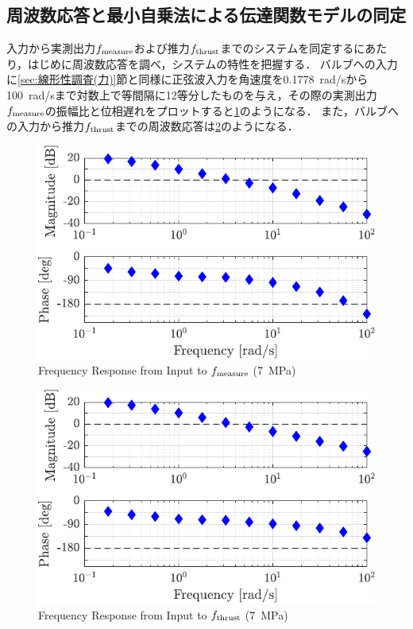 \subsection{周波数応答と最小自乗法による伝達関数モデルの同定}
入力から実測出力$f_\mathrm{measure}$および推力$f_\mathrm{thrust}$までのシステムを同定するにあたり，はじめに周波数応答を調べ，システムの特性を把握する．
バルブへの入力に\ref{sec:線形性調査(力)}節と同様に正弦波入力を角速度を\SI{0.1778}{rad/s}から\SI{100}{rad/s}まで対数上で等間隔に12等分したものを与え，その際の実測出力$f_\mathrm{measure}$の振幅比と位相遅れをプロットすると\figname\ref{fig:crop-1018_manubode_in2fmea_7MPa}のようになる．
また，バルブへの入力から推力$f_\mathrm{thrust}$までの周波数応答は\figname\ref{fig:crop-1018_manubode_in2fthr_7MPa}のようになる．
\begin{figure}[t]
    \centering
        \includegraphics[keepaspectratio, scale=1.0]{contents/システム同定/figure/crop-1018_manubode_in2fmea_7MPa.pdf}
        \caption{Frequency Response from Input to $f_\mathrm{measure}$ (\SI{7}{MPa})}
        \label{fig:crop-1018_manubode_in2fmea_7MPa}
\end{figure}
\begin{figure}[t]
    \centering
        \includegraphics[keepaspectratio, scale=1.0]{contents/システム同定/figure/crop-1018_manubode_in2fthr_7MPa.pdf}
        \caption{Frequency Response from Input to $f_\mathrm{thrust}$ (\SI{7}{MPa})}
        \label{fig:crop-1018_manubode_in2fthr_7MPa}
\end{figure}

